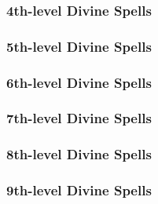\subsubsection{4th-level Divine Spells}
\begin{spelllist}
    \SLairwalk
    \SLavatarofhealing
    \SLbladebarrier
    \SLconfusion
    \SLdeathward
    \SLenervation
    \SLmarkofscrying
    \SLpoison
\end{spelllist}

\subsubsection{5th-level Divine Spells}
\begin{spelllist}
    \SLblasphemy
    \SLcacaphonicword
    \SLcircleofdeath
    \SLcircleofhealing
    \SLdictum
    \SLdivinemight
    \SLflamestrike
    \SLholyword
    \SLrevivify
    \SLspiritualweapon
\end{spelllist}

\subsubsection{6th-level Divine Spells}
\begin{spelllist}
    \SLblessedblade
    \SLheal
    \SLtrueseeing
    \SLwordofrecall
\end{spelllist}

\subsubsection{7th-level Divine Spells}
\begin{spelllist}
    \SLantimagicfield
    \SLantilifeshell
    \SLavataroffealty
    \SLavatarofshielding
    \SLdivinejudgment
    \SLdivineshield
\end{spelllist}

\subsubsection{8th-level Divine Spells}
\begin{spelllist}
    \SLavatarofsuffering
    \SLmartyrsgift
\end{spelllist}

\subsubsection{9th-level Divine Spells}
\begin{spelllist}
    \SLavatarofchaos
    \SLavataroforder
    \SLavataroflife
    \SLearthquake
    \SLholyavatar
    \SLimplosion
    \SLstormofvengeance
    \SLunholyavatar
\end{spelllist}

